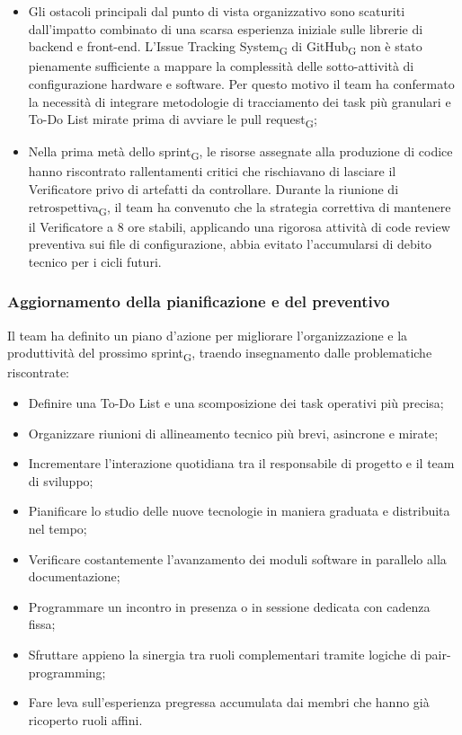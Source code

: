 \documentclass[a4paper, 10pt, colorlinks=true, linkcolor=black, urlcolor=blue, citecolor=blue, hidelinks]{article}
\begin{document}
\begin{itemize}
    \item Gli ostacoli principali dal punto di vista organizzativo sono scaturiti dall'impatto combinato di una scarsa esperienza iniziale sulle librerie di backend e front-end. L'Issue Tracking System\textsubscript{G} di GitHub\textsubscript{G} non è stato pienamente sufficiente a mappare la complessità delle sotto-attività di configurazione hardware e software. Per questo motivo il team ha confermato la necessità di integrare metodologie di tracciamento dei task più granulari e To-Do List mirate prima di avviare le pull request\textsubscript{G};
    \item Nella prima metà dello sprint\textsubscript{G}, le risorse assegnate alla produzione di codice hanno riscontrato rallentamenti critici che rischiavano di lasciare il Verificatore privo di artefatti da controllare. Durante la riunione di retrospettiva\textsubscript{G}, il team ha convenuto che la strategia correttiva di mantenere il Verificatore a 8 ore stabili, applicando una rigorosa attività di code review preventiva sui file di configurazione, abbia evitato l'accumularsi di debito tecnico per i cicli futuri.
\end{itemize}

\subsubsection{Aggiornamento della pianificazione e del preventivo}
Il team ha definito un piano d'azione per migliorare l'organizzazione e la produttività del prossimo sprint\textsubscript{G}, traendo insegnamento dalle problematiche riscontrate:
\begin{itemize}
    \item Definire una To-Do List e una scomposizione dei task operativi più precisa;
    \item Organizzare riunioni di allineamento tecnico più brevi, asincrone e mirate;
    \item Incrementare l'interazione quotidiana tra il responsabile di progetto e il team di sviluppo;
    \item Pianificare lo studio delle nuove tecnologie in maniera graduata e distribuita nel tempo;
    \item Verificare costantemente l'avanzamento dei moduli software in parallelo alla documentazione;
    \item Programmare un incontro in presenza o in sessione dedicata con cadenza fissa;
    \item Sfruttare appieno la sinergia tra ruoli complementari tramite logiche di pair-programming;
    \item Fare leva sull'esperienza pregressa accumulata dai membri che hanno già ricoperto ruoli affini.
\end{itemize}
\end{document}
